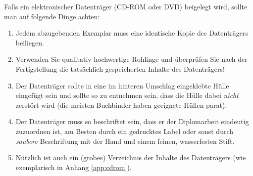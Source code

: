 Falls ein elektronischer Datenträger (CD-ROM oder DVD) beigelegt
wird, sollte man auf folgende Dinge achten:
%
\begin{enumerate}
\item Jedem abzugebenden Exemplar muss eine identische Kopie des
Datenträgers beiliegen. %
\item Verwenden Sie qualitativ hochwertige Rohlinge und überprüfen
Sie nach der Fertigstellung die tatsächlich gespeicherten Inhalte
des Datenträgers! %
\item Der Datenträger sollte in eine im hinteren Umschlag
eingeklebte Hülle eingefügt sein und sollte so zu entnehmen sein,
dass die Hülle dabei \emph{nicht} zerstört wird (die
meisten Buchbinder haben geeignete Hüllen parat). %
\item Der Datenträger muss so beschriftet sein, dass er der
Diplomarbeit eindeutig zuzuordnen ist, am Besten durch ein
gedrucktes Label oder sonst durch \emph{saubere}
Beschriftung mit der Hand und einem feinen, wasserfesten Stift. %
\item Nützlich ist auch ein (grobes) Verzeichnis der Inhalte des
Datenträgers (wie exemplarisch in Anhang \ref{app:cdrom}).
\end{enumerate}
